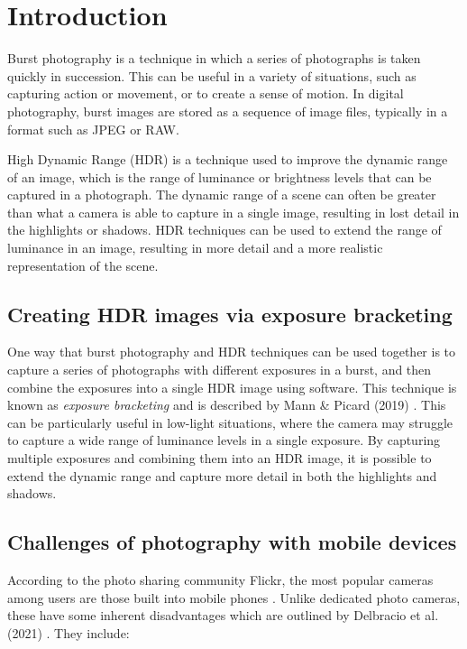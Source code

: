 \documentclass{egpubl}
\begin{document}
\section{Introduction}
\label{sec:introduction}

Burst photography is a technique in which a series of photographs is taken quickly in succession.
This can be useful in a variety of situations, such as capturing action or movement, 
or to create a sense of motion. In digital photography, burst images are stored as a 
sequence of image files, typically in a format such as JPEG or RAW.

High Dynamic Range (HDR) is a technique used to improve the dynamic range of an image, 
which is the range of luminance or brightness levels that can be captured in a photograph. 
The dynamic range of a scene can often be greater than what a camera is able to capture 
in a single image, resulting in lost detail in the highlights or shadows. 
HDR techniques can be used to extend the range of luminance in an image, 
resulting in more detail and a more realistic representation of the scene.

\subsection{Creating HDR images via exposure bracketing}
\label{sec:bracketing}

One way that burst photography and HDR techniques can be used together
is to capture a series of photographs with different exposures in a burst, and then combine 
the exposures into a single HDR image using software. This technique is known as 
\textit{exposure bracketing} and is described by Mann {\&} Picard (2019) \cite{mann1994bracketing}. 
This can be particularly useful in low-light situations, where the camera may struggle to 
capture a wide range of luminance levels in a single exposure. By capturing multiple exposures and combining them into an 
HDR image, it is possible to extend the dynamic range and capture more detail in both the 
highlights and shadows.

\subsection{Challenges of photography with mobile devices}
\label{sec:challenges}

According to the photo sharing community Flickr, the most 
popular cameras among users are those built into mobile phones \cite{flickr2023popularity}. Unlike dedicated photo cameras, these have 
some inherent disadvantages which are outlined by Delbracio et al. (2021) \cite{delbracio2021mobile}. 
They include:
\end{document}
